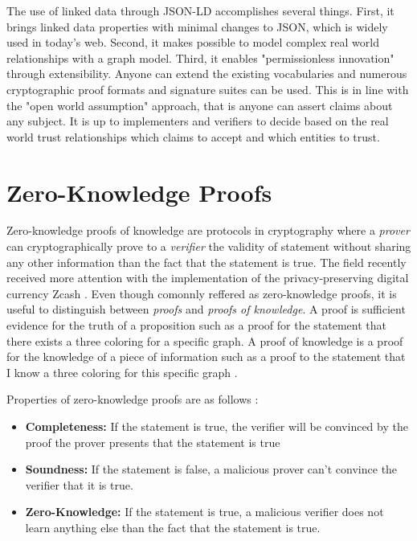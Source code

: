 The use of linked data through JSON-LD accomplishes several things. First, it  brings linked data properties with minimal changes to JSON, which is widely used in today's web. Second, it makes possible to model complex real world relationships with a graph model. Third, it enables "permissionless innovation" through extensibility. Anyone can extend the existing vocabularies and numerous cryptographic proof formats and signature suites can be used. This is in line with the "open world assumption" approach, that is anyone can assert claims about any subject. It is up to implementers and verifiers to decide based on the real world trust relationships which claims to accept and which entities to trust.

\section{Zero-Knowledge Proofs}

Zero-knowledge proofs of knowledge are protocols in cryptography where a \textit{prover} can cryptographically prove to a \textit{verifier} the validity of statement without sharing any other information than the fact that the statement is true. The field recently received more attention with the implementation of the privacy-preserving digital currency Zcash \parencite{E.BenSasson.2016}. Even though comonnly reffered as zero-knowledge proofs, it is useful to distinguish between \textit{proofs} and \textit{proofs of knowledge}. A proof is sufficient evidence for the truth of a proposition such as a proof for the statement that there exists a three coloring for a specific graph. A proof of knowledge is a proof for the knowledge of a piece of information such as a proof to the statement that I know a three coloring for this specific graph \parencite{green_2017}. 

Properties of zero-knowledge proofs are as follows \parencite{Groth.2010}:
\begin{itemize}
  \item \textbf{Completeness:} If the statement is true, the verifier will be convinced by the proof the prover presents that the statement is true
  \item \textbf{Soundness:} If the statement is false, a malicious prover can't convince the verifier that it is true.
  \item \textbf{Zero-Knowledge:} If the statement is true, a malicious verifier does not learn anything else than the fact that the statement is true.
\end{itemize}


